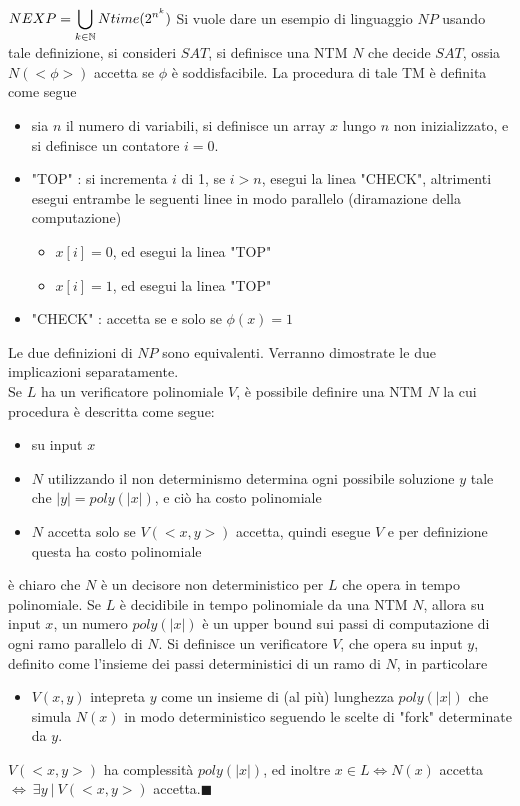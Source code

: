 \documentclass[10pt, letterpaper]{report}
\begin{document}
 $\displaystyle NEXP=\bigcup_{k\in{\mathbb N}}Ntime(2^{n^k})$\acc
Si vuole dare un esempio di linguaggio $NP$ usando tale definizione, si consideri $SAT$, si definisce una NTM $N$ che decide $SAT$, ossia $N(<\phi>)$ accetta se $\phi$ è soddisfacibile. La procedura di tale TM è definita come segue\begin{itemize}
    \item sia $n$ il numero di variabili, si definisce un array $x$ lungo $n$ non inizializzato, e si definisce un contatore $i=0$. 
    \item "TOP" : si incrementa $i$ di 1, se $i>n$, esegui la linea "CHECK", altrimenti esegui entrambe le seguenti linee in modo parallelo (diramazione della computazione)\begin{itemize}
        \item $x[i]=0$, ed esegui la linea "TOP"
        \item $x[i]=1$, ed esegui la linea "TOP"
    \end{itemize}
    \item "CHECK" : accetta se e solo se $\phi(x)=1$
\end{itemize}
\teo{} Le due definizioni di $NP$ sono equivalenti.\acc 
\dimo{} Verranno dimostrate le due implicazioni separatamente.\\ 
\boxedMath{$\implies$} Se $L$ ha un verificatore polinomiale $V$, è possibile definire una NTM $N$ la cui procedura è descritta come segue:\begin{itemize}
    \item su input $x$
    \item $N$ utilizzando il non determinismo determina ogni possibile soluzione $y$ tale che $|y|=poly(|x|)$, e ciò ha costo polinomiale
    \item $N$ accetta solo se $V(<x,y>)$ accetta, quindi esegue $V$ e per definizione questa ha costo polinomiale 
\end{itemize}
è chiaro che $N$ è un decisore non deterministico per $L$ che opera in tempo polinomiale.\acc 
\boxedMath{$\impliedby$} Se $L$ è decidibile in tempo polinomiale da una NTM $N$, allora su input $x$, un numero $poly(|x|)$ è un upper bound sui passi di computazione di ogni ramo parallelo di $N$. Si definisce un verificatore $V$, che opera su input $y$, definito come l'insieme dei passi deterministici di un ramo di $N$, in particolare\begin{itemize}
    \item $V(x,y)$ intepreta $y$ come un insieme di (al più) lunghezza $poly(|x|)$ che simula $N(x)$ in modo deterministico seguendo le scelte di "fork" determinate da $y$. 
\end{itemize}
$V(<x,y>)$ ha complessità $poly(|x|)$, ed inoltre $x\in L \iff N(x)$ accetta $\iff \ \exists y \ | \ V(<x,y>)$  accetta.\hfill$\blacksquare$
\flowerLine 
\end{document}
